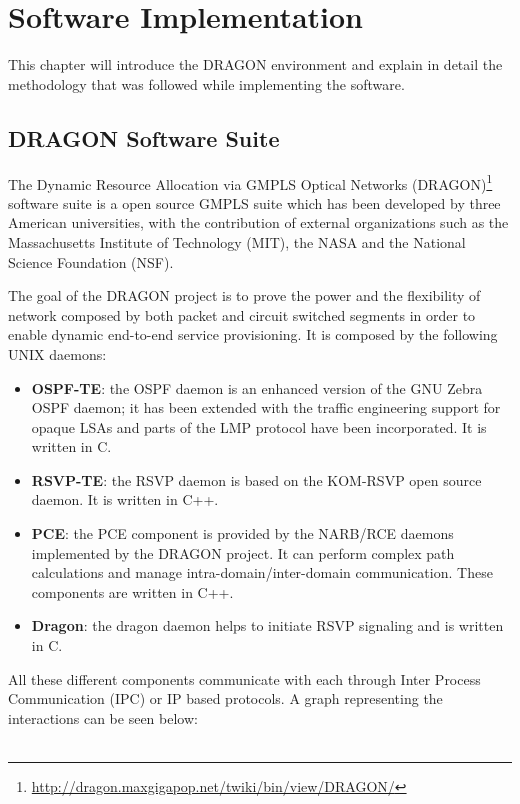 \documentclass[10pt,a4paper]{report}
\begin{document}
\chapter{Software Implementation}\label{sec:softimpl}

This chapter will introduce the DRAGON environment and explain in
detail the methodology that was followed while implementing the
software.

\section{DRAGON Software Suite}

The Dynamic Resource Allocation via GMPLS Optical Networks
(DRAGON)\footnote{\url{http://dragon.maxgigapop.net/twiki/bin/view/DRAGON/}}
software suite is a open source GMPLS suite which has been developed
by three American universities, with the contribution of external
organizations such as the Massachusetts Institute of Technology (MIT),
the NASA and the National Science Foundation (NSF).

The goal of the DRAGON project is to prove the power and the
flexibility of network composed by both packet and circuit switched
segments in order to enable dynamic end-to-end service
provisioning. It is composed by the following UNIX daemons:

\begin{itemize}
\item \textbf{OSPF-TE}: the OSPF daemon is an enhanced version of the
  GNU Zebra OSPF daemon; it has been extended with the traffic
  engineering support for opaque LSAs and parts of the LMP protocol
  have been incorporated. It is written in C.
\item \textbf{RSVP-TE}: the RSVP daemon is based on the KOM-RSVP open
  source daemon. It is written in C++.
\item \textbf{PCE}: the PCE component is provided by the NARB/RCE
  daemons implemented by the DRAGON project. It can perform complex
  path calculations and manage intra-domain/inter-domain
  communication. These components are written in C++.
\item \textbf{Dragon}: the dragon daemon helps to initiate RSVP
  signaling and is written in C.
\end{itemize}

All these different components communicate with each through Inter
Process Communication (IPC) or IP based protocols. A graph
representing the interactions can be seen below:\\\\
\end{document}
